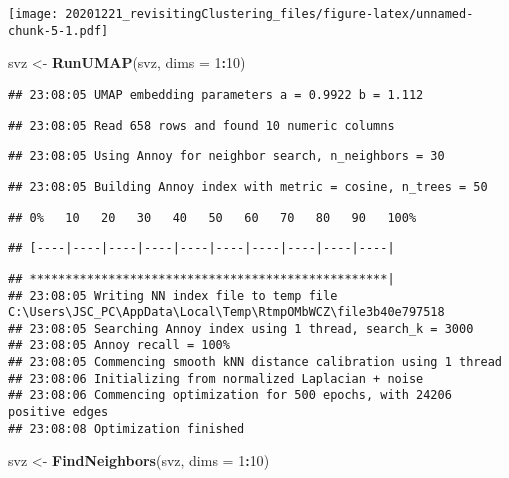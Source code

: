 \documentclass[
]{article}
\newenvironment{Shaded}{\begin{snugshade}}{\end{snugshade}}
\newcommand{\DataTypeTok}[1]{\textcolor[rgb]{0.13,0.29,0.53}{#1}}
\newcommand{\DecValTok}[1]{\textcolor[rgb]{0.00,0.00,0.81}{#1}}
\newcommand{\KeywordTok}[1]{\textcolor[rgb]{0.13,0.29,0.53}{\textbf{#1}}}
\newcommand{\NormalTok}[1]{#1}
\newcommand{\OperatorTok}[1]{\textcolor[rgb]{0.81,0.36,0.00}{\textbf{#1}}}
\newcommand{\StringTok}[1]{\textcolor[rgb]{0.31,0.60,0.02}{#1}}
\begin{document}
\texttt{[image: 20201221\_revisitingClustering\_files/figure-latex/unnamed-chunk-5-1.pdf]}

\begin{Shaded}
\begin{Highlighting}[]
\NormalTok{svz <-}\StringTok{ }\KeywordTok{RunUMAP}\NormalTok{(svz, }\DataTypeTok{dims =} \DecValTok{1}\OperatorTok{:}\DecValTok{10}\NormalTok{)}
\end{Highlighting}
\end{Shaded}

\begin{verbatim}
## 23:08:05 UMAP embedding parameters a = 0.9922 b = 1.112
\end{verbatim}

\begin{verbatim}
## 23:08:05 Read 658 rows and found 10 numeric columns
\end{verbatim}

\begin{verbatim}
## 23:08:05 Using Annoy for neighbor search, n_neighbors = 30
\end{verbatim}

\begin{verbatim}
## 23:08:05 Building Annoy index with metric = cosine, n_trees = 50
\end{verbatim}

\begin{verbatim}
## 0%   10   20   30   40   50   60   70   80   90   100%
\end{verbatim}

\begin{verbatim}
## [----|----|----|----|----|----|----|----|----|----|
\end{verbatim}

\begin{verbatim}
## **************************************************|
## 23:08:05 Writing NN index file to temp file C:\Users\JSC_PC\AppData\Local\Temp\RtmpOMbWCZ\file3b40e797518
## 23:08:05 Searching Annoy index using 1 thread, search_k = 3000
## 23:08:05 Annoy recall = 100%
## 23:08:05 Commencing smooth kNN distance calibration using 1 thread
## 23:08:06 Initializing from normalized Laplacian + noise
## 23:08:06 Commencing optimization for 500 epochs, with 24206 positive edges
## 23:08:08 Optimization finished
\end{verbatim}

\begin{Shaded}
\begin{Highlighting}[]
\NormalTok{svz <-}\StringTok{ }\KeywordTok{FindNeighbors}\NormalTok{(svz, }\DataTypeTok{dims =} \DecValTok{1}\OperatorTok{:}\DecValTok{10}\NormalTok{)}
\end{Highlighting}
\end{Shaded}
\end{document}
